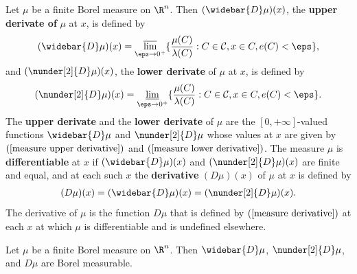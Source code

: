 Let $\mu$ be a finite Borel measure on $\R^n$. Then $(\widebar{D}\mu)(x)$, the \textbf{upper derivate of} $\mu$ at $x$, is defined by
\begin{align}\label{measure upper derivative}
(\widebar{D}\mu)(x)=\varlimsup_{\eps\to 0^+}\{\frac{\mu(C)}{\lambda(C)}:C\in\mathcal{C},x\in C,e(C)<\eps\},
\end{align}
and $(\nunder[2]{D}\mu)(x)$, the \textbf{lower derivate} of $\mu$ at $x$, is defined by
\begin{align}\label{measure lower derivative}
(\nunder[2]{D}\mu)(x)=\varliminf_{\eps\to 0^+}\{\frac{\mu(C)}{\lambda(C)}:C\in\mathcal{C},x\in C,e(C)<\eps\}.
\end{align}
The \textbf{upper derivate} and the \textbf{lower derivate} of $\mu$ are the $[0,+\infty]$-valued functions $\widebar{D}\mu$ and $\nunder[2]{D}\mu$ whose values at $x$ are given by $(\ref{measure upper derivative})$ and $(\ref{measure lower derivative})$. The measure $\mu$ is \textbf{differentiable} at $x$ if $(\widebar{D}\mu)(x)$ and $(\nunder[2]{D}\mu)(x)$ are finite and equal, and at each such $x$ the \textbf{derivative} $(D\mu)(x)$ of $\mu$ at $x$ is defined by
\begin{align}\label{measure derivative}
(D\mu)(x)=(\widebar{D}\mu)(x)=(\nunder[2]{D}\mu)(x).
\end{align}
The derivative of $\mu$ is the function $D\mu$ that is defined by $(\ref{measure derivative})$ at each $x$ at which $\mu$ is differentiable and is undefined elsewhere.
\begin{lemma}\label{measure derivative is measurable}
Let $\mu$ be a finite Borel measure on $\R^n$. Then $\widebar{D}\mu$, $\nunder[2]{D}\mu$, and $D\mu$ are Borel measurable.
\end{lemma}
